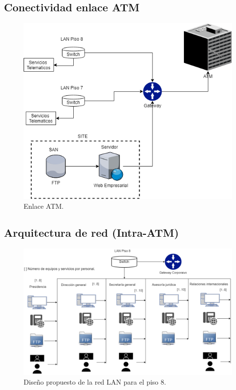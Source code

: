 \documentclass[12pt,letterpaper]{article}
\begin{document}
\subsection{Conectividad enlace ATM}
\begin{figure}[ht]
    \centering
    \includegraphics[width=.9\textwidth]{imagenes/atmdia.png}
    \caption{Enlace ATM.}
\end{figure}

\newpage
\subsection{Arquitectura de red (Intra-ATM)}
\begin{figure}[ht]
    \centering
    \includegraphics[width=.9\textwidth,angle=90]{imagenes/Lan8.png}
    \caption{Diseño propuesto de la red LAN para el piso 8.}
\end{figure}
\end{document}

